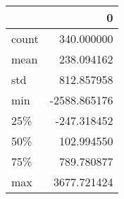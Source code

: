 \begin{tabular}{lr}
\toprule
{} &            0 \\
\midrule
count &   340.000000 \\
mean  &   238.094162 \\
std   &   812.857958 \\
min   & -2588.865176 \\
25\%   &  -247.318452 \\
50\%   &   102.994550 \\
75\%   &   789.780877 \\
max   &  3677.721424 \\
\bottomrule
\end{tabular}
